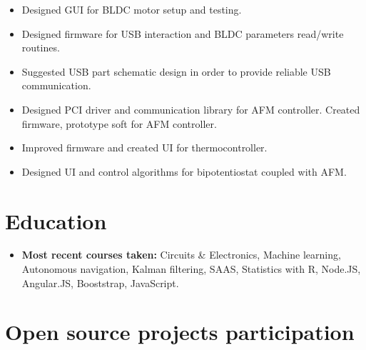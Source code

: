 \documentclass{sb_cv}
\begin{document}
\begin{itemize}
\item Designed GUI for BLDC motor setup and testing.
\item Designed firmware for USB interaction and BLDC parameters read/write routines.
\item Suggested USB part schematic design in order to provide reliable USB communication.
\end{itemize}

\begin{itemize}
\item Designed PCI driver and communication library for AFM controller. Created firmware, prototype soft for AFM controller.
\item Improved firmware and created UI for thermocontroller.
\item Designed UI and control algorithms for bipotentiostat coupled with AFM.
\end{itemize}


\section{Education}
\begin{itemize}
\item \textbf{Most recent courses taken:} Circuits \& Electronics, Machine learning, Autonomous navigation, Kalman filtering, SAAS, Statistics with R, Node.JS, Angular.JS, Booststrap, JavaScript.
\end{itemize}

\section{Open source projects participation}
\end{document}
